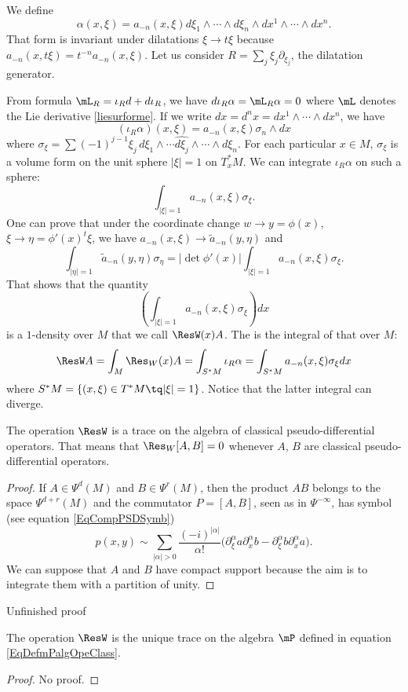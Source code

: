 We define 
\[ 
  \alpha(x,\xi)=a_{-n}(x,\xi)d\xi_1\wedge\cdots\wedge d\xi_n\wedge dx^1\wedge\cdots\wedge dx^n.
\]
That form is invariant under dilatations $\xi\to t\xi$ because $a_{-n}(x,t\xi)=t^{-n}a_{-n}(x,\xi)$. Let us consider $R=\sum_j \xi_j\partial_{\xi_j}$, the dilatation generator.

From formula $\mL_R=\iota_Rd+d\iota_R$, we have $d\iota_R\alpha=\mL_R\alpha=0$ where $\mL$ denotes the Lie derivative \eqref{liesurforme}. If we write $dx=d^nx=dx^1\wedge\cdots\wedge dx^n$, we have
\[ 
  (\iota_R\alpha)(x,\xi)=a_{-n}(x,\xi)\sigma_n\wedge dx
\]
where $\sigma_{\xi}=\sum (-1)^{j-1}\xi_j\,d\xi_1\wedge\cdots\widehat{d\xi_j}\wedge\cdots\wedge d\xi_n$. For each particular $x\in M$, $\sigma_{\xi}$ is a volume form on the unit sphere $| \xi |=1$ on $T^*_xM$. We can integrate $\iota_R\alpha$ on such a sphere:
\[ 
  \int_{| \xi |=1}a_{-n}(x,\xi)\sigma_{\xi}.
\]
One can prove that under the coordinate change $w\to y=\phi(x)$, $\xi\to\eta=\phi'(x)^t\xi$, we have $a_{-n}(x,\xi)\to \tilde a_{-n}(y,\eta)$ and
\[ 
  \int_{| \eta |=1}\tilde a_{-n}(y,\eta)\sigma_{\eta}=| \det\phi'(x) |\int_{| \xi |=1}a_{-n}(x,\xi)\sigma_{\xi}.
\]
That shows that the quantity
\begin{equation}
\left( \int_{| \xi |=1}a_{-n}(x,\xi)\sigma_{\xi} \right)dx
\end{equation}
is a $1$-density over $M$ that we call $\ResW(x)A$. The  is the integral of that over $M$:
\begin{equation}
\ResW A=\int_M\Res_W(x)A=\int_{S^*M}\iota_R\alpha=\int_{S^*M}a_{-n}(x,\xi)\sigma_{\xi}dx
\end{equation}
where $S^*M=\{ (x,\xi)\in T^*M\tq | \xi |=1 \}$. Notice that the latter integral can diverge.

\begin{proposition}
The operation $\ResW$ is a trace on the algebra of classical pseudo-differential operators. That means that $\Res_W[A,B]=0$ whenever $A$, $B$ are classical pseudo-differential operators.
\end{proposition}

\begin{proof}
If $A\in\Psi^d(M)$ and $B\in\Psi^r(M)$, then the product $AB$ belongs to the space $\Psi^{d+r}(M)$ and the commutator $P=[A,B]$,  seen as in $\Psi^{-\infty}$, has symbol (see equation \eqref{EqCompPSDSymb})
\[ 
  p(x,y)\sim\sum_{| \alpha |>0}\frac{ (-i)^{| \alpha |} }{ \alpha! }\big( \partial^{\alpha}_{\xi}a\partial_x^{\alpha}b-\partial^{\alpha}_{\xi}b\partial_x^{\alpha}a \big).
\]
We can suppose that $A$ and $B$ have compact support because the aim is to integrate them with a partition of unity.
\end{proof}

\begin{probleme}
	Unfinished proof
\end{probleme}

\begin{proposition}
The operation $\ResW$ is the unique trace on the algebra $\mP$ defined in equation \ref{EqDefmPalgOpeClass}.
\end{proposition}
\begin{proof}
No proof.
\end{proof}
